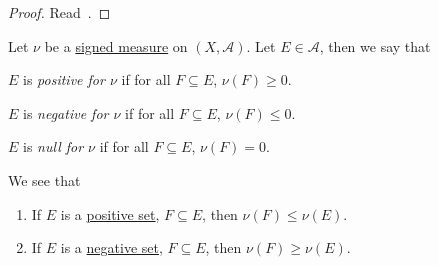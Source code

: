 \begin{proof}
	Read~\cite{folland1999real}.
\end{proof}
\begin{definition*}
	Let \(\nu\) be a \hyperref[def:signed-measure]{signed measure} on \((X, \mathcal{A})\). Let \(E \in \mathcal{A}\), then we say that
	\begin{definition}\label{def:positive-set-for-a-signed-measure}
		\(E\) is \emph{positive for \(\nu\)} if for all \(F \subseteq E\), \(\nu(F) \geq 0\).
	\end{definition}
	\begin{definition}\label{def:negative-set-for-a-signed-measure}
		\(E\) is \emph{negative for \(\nu\)} if for all \(F \subseteq E\), \(\nu(F) \leq 0\).
	\end{definition}
	\begin{definition}\label{def:null-set-for-a-signed-measure}
		\(E\) is \emph{null for \(\nu\)} if for all \(F \subseteq E\), \(\nu(F) = 0\).
	\end{definition}
\end{definition*}

\begin{note}
	We see that
	\begin{enumerate}[(1)]
		\item If \(E\) is a \hyperref[def:positive-set-for-a-signed-measure]{positive set}, \(F \subseteq E\), then \(\nu(F) \leq \nu(E)\).
		\item If \(E\) is a \hyperref[def:negative-set-for-a-signed-measure]{negative set}, \(F \subseteq E\), then \(\nu(F) \geq \nu(E)\).
	\end{enumerate}
\end{note}

